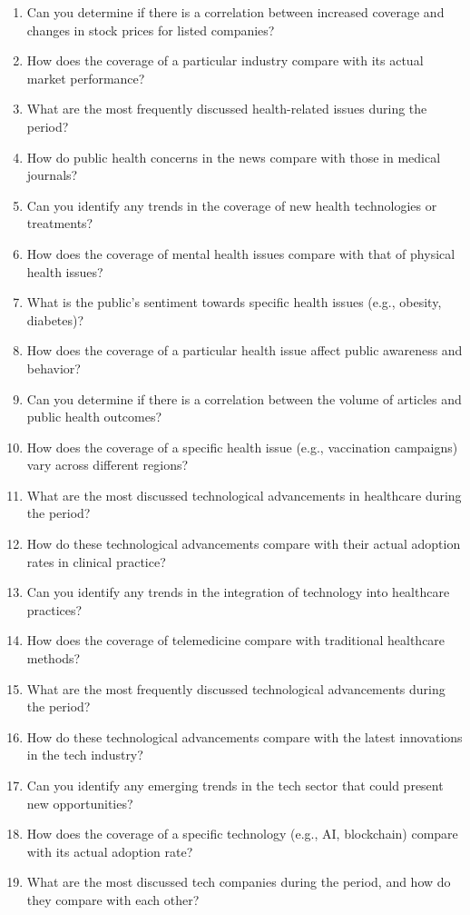 \begin{footnotesize}
\begin{enumerate}[label={\(q_{\arabic*}\).},start=0]
\item Can you determine if there is a correlation between increased coverage and changes in stock prices for listed companies?
\item How does the coverage of a particular industry compare with its actual market performance?
\item What are the most frequently discussed health-related issues during the period?
\item How do public health concerns in the news compare with those in medical journals?
\item Can you identify any trends in the coverage of new health technologies or treatments?
\item How does the coverage of mental health issues compare with that of physical health issues?
\item What is the public's sentiment towards specific health issues (e.g., obesity, diabetes)?
\item How does the coverage of a particular health issue affect public awareness and behavior?
\item Can you determine if there is a correlation between the volume of articles and public health outcomes?
\item How does the coverage of a specific health issue (e.g., vaccination campaigns) vary across different regions?
\item What are the most discussed technological advancements in healthcare during the period?
\item How do these technological advancements compare with their actual adoption rates in clinical practice?
\item Can you identify any trends in the integration of technology into healthcare practices?
\item How does the coverage of telemedicine compare with traditional healthcare methods?
\item What are the most frequently discussed technological advancements during the period?
\item How do these technological advancements compare with the latest innovations in the tech industry?
\item Can you identify any emerging trends in the tech sector that could present new opportunities?
\item How does the coverage of a specific technology (e.g., AI, blockchain) compare with its actual adoption rate?
\item What are the most discussed tech companies during the period, and how do they compare with each other?

\end{enumerate}
\end{footnotesize}
